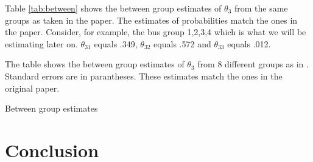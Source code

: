 \documentclass[11pt,letterpaper]{article}
\newcommand{\floatintro}[1]{
  
  \vspace*{0.1in}
  
  {\footnotesize

    #1
    
  }
  
  \vspace*{0.1in} } \newcommand{\Hline}{\noindent\rule{18cm}{0.5pt}}
\begin{document}
Table \ref{tab:between} shows the between group estimates of
$\theta_3$ from the same groups as taken in the paper. The estimates
of probabilities match the ones in the paper. Consider, for example,
the bus group 1,2,3,4 which is what we will be estimating later
on. $\theta_{31}$ equals .349, $\theta_{32}$ equals .572 and
$\theta_{33}$ equals .012. 
\begin{table}[htbp!]
  \floatintro{The table shows the between group estimates of $\theta_3$
    from 8 different groups as in \citet{rust1987optimal}. Standard
    errors are in parantheses. These estimates match the ones in the
    original paper.}
  \centering
  \resizebox{\textwidth}{!}{
    }
  \caption{Between group estimates}
  \label{tab:between}
\end{table}

\section{Conclusion}

\newpage

\end{document}
